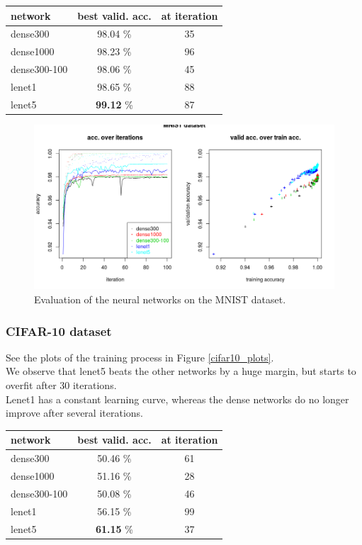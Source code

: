 \begin{tabular}{|l|c|c|}
 \hline
 network & best valid. acc. & at iteration\\ \hline
 dense300 & 98.04 \% & 35\\
 dense1000 & 98.23 \% & 96\\
 dense300-100 & 98.06 \% & 45\\
 lenet1 & 98.65 \% & 88\\
 lenet5 & \textbf{99.12} \% & 87\\
 \hline
\end{tabular}

\begin{figure}
 \includegraphics[width=\textwidth]{../plots/nn_mnist}
 \caption{Evaluation of the neural networks on the MNIST dataset.}
 \label{mnist_plots}
\end{figure}


\subsubsection{CIFAR-10 dataset}

See the plots of the training process in Figure \ref{cifar10_plots}.\\
We observe that lenet5 beats the other networks by a huge margin,
but starts to overfit after 30 iterations.\\
Lenet1 has a constant learning curve, whereas the dense networks do no longer improve after several iterations.\\

\begin{tabular}{|l|c|c|}
 \hline
 network & best valid. acc. & at iteration\\ \hline
 dense300 & 50.46 \% & 61\\
 dense1000 & 51.16 \% & 28\\
 dense300-100 & 50.08 \% & 46\\
 lenet1 & 56.15 \% & 99\\
 lenet5 & \textbf{61.15} \% & 37\\
 \hline
\end{tabular}\\

